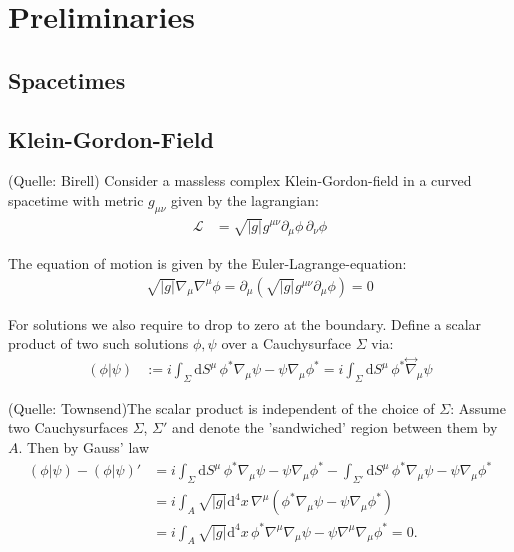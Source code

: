 \chapter{Preliminaries}
\section{Spacetimes}

\section{Klein-Gordon-Field}
(Quelle: Birell)
Consider a massless complex Klein-Gordon-field in a curved spacetime with metric \(g_{\mu\nu}\) given by the lagrangian:
\begin{align*}
\mathcal{L} &= \sqrt{|g|} g^{\mu\nu} \partial_\mu \phi\,\partial_\nu \phi 
\end{align*}

The equation of motion is given by the Euler-Lagrange-equation:
\begin{align*}
\sqrt{|g|}\nabla_\mu\nabla^\mu \phi = \partial_\mu \left(\sqrt{|g|} g^{\mu\nu} \partial_\mu \phi\right) = 0
\end{align*}

For solutions we also require to drop to zero at the boundary. Define a scalar product of two such solutions $\phi, \psi$ over a Cauchysurface \(\Sigma\) via:
\begin{align*}
(\phi|\psi) &:= i \int_{\Sigma} \mathrm{d}S^\mu\, \phi^*\nabla_\mu \psi - \psi\nabla_\mu \phi^* = i \int_{\Sigma} \mathrm{d}S^\mu\, \phi^*\overset{\leftrightarrow}{\nabla}_\mu \psi
\end{align*}

(Quelle: Townsend)The scalar product is independent of the choice of \(\Sigma\): Assume two Cauchysurfaces \(\Sigma\), \(\Sigma'\) and denote the 'sandwiched' region between them by \(A\). Then by Gauss' law
\begin{align*}
(\phi|\psi) - (\phi|\psi)' &= i\int_{\Sigma}\mathrm{d}S^\mu\, \phi^*\nabla_\mu \psi - \psi\nabla_\mu \phi^* - \int_{\Sigma'}\mathrm{d}S^\mu\, \phi^*\nabla_\mu \psi - \psi\nabla_\mu \phi^*\\
	&= i\int_{A} \sqrt{|g|} \mathrm{d^4}x\,\nabla^\mu \left(\phi^*\nabla_\mu \psi - \psi\nabla_\mu \phi^*\right)\\
	&= i\int_{A} \sqrt{|g|} \mathrm{d^4}x\,\phi^*\nabla^\mu\nabla_\mu \psi - \psi \nabla^\mu\nabla_\mu\phi^* = 0.
\end{align*}

